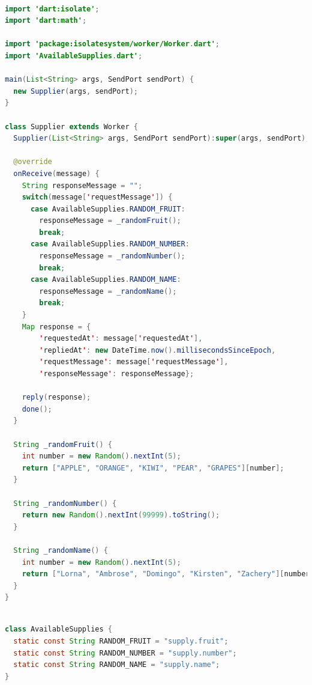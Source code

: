 \begin{lstlisting}[language=java, firstnumber=1, caption=Basic version of Consumer Worker of Producer-Consumer application, label=lst:consumer]

import 'dart:isolate';
import 'dart:math';

import 'package:isolatesystem/worker/Worker.dart';
import 'AvailableSupplies.dart';

main(List<String> args, SendPort sendPort) {
  new Supplier(args, sendPort);
}

class Supplier extends Worker {
  Supplier(List<String> args, SendPort sendPort):super(args, sendPort);

  @override
  onReceive(message) {
    String responseMessage = "";
    switch(message['requestMessage']) {
      case AvailableSupplies.RANDOM_FRUIT:
        responseMessage = _randomFruit();
        break;
      case AvailableSupplies.RANDOM_NUMBER:
        responseMessage = _randomNumber();
        break;
      case AvailableSupplies.RANDOM_NAME:
        responseMessage = _randomName();
        break;
    }
    Map response = {
        'requestedAt': message['requestedAt'],
        'repliedAt': new DateTime.now().millisecondsSinceEpoch,
        'requestMessage': message['requestMessage'],
        'responseMessage': responseMessage};

    reply(response);
    done();
  }

  String _randomFruit() {
    int number = new Random().nextInt(5);
    return ["APPLE", "ORANGE", "KIWI", "PEAR", "GRAPES"][number];
  }

  String _randomNumber() {
    return new Random().nextInt(99999).toString();
  }

  String _randomName() {
    int number = new Random().nextInt(5);
    return ["Lorna", "Ambrose", "Domingo", "Kirsten", "Zachery"][number];
  }
}

\end{lstlisting}

\begin{lstlisting}[language=java, firstnumber=1, caption=Supporting class that contains list of constants for pattern matching, label=lst:supportingClass]

class AvailableSupplies {
  static const String RANDOM_FRUIT = "supply.fruit";
  static const String RANDOM_NUMBER = "supply.number";
  static const String RANDOM_NAME = "supply.name";
}
\end{lstlisting}


